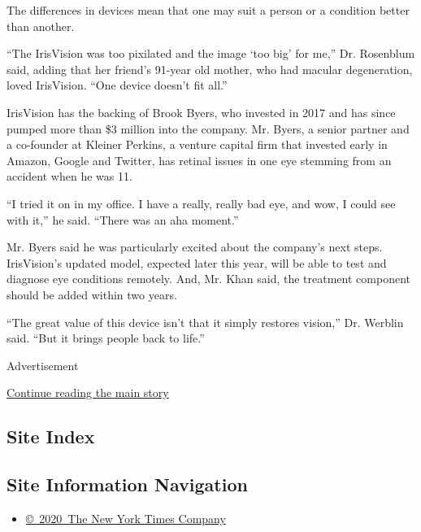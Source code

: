 The differences in devices mean that one may suit a person or a
condition better than another.

``The IrisVision was too pixilated and the image `too big' for me,'' Dr.
Rosenblum said, adding that her friend's 91-year old mother, who had
macular degeneration, loved IrisVision. ``One device doesn't fit all.''

IrisVision has the backing of Brook Byers, who invested in 2017 and has
since pumped more than \$3 million into the company. Mr. Byers, a senior
partner and a co-founder at Kleiner Perkins, a venture capital firm that
invested early in Amazon, Google and Twitter, has retinal issues in one
eye stemming from an accident when he was 11.

``I tried it on in my office. I have a really, really bad eye, and wow,
I could see with it,'' he said. ``There was an aha moment.''

Mr. Byers said he was particularly excited about the company's next
steps. IrisVision's updated model, expected later this year, will be
able to test and diagnose eye conditions remotely. And, Mr. Khan said,
the treatment component should be added within two years.

``The great value of this device isn't that it simply restores vision,''
Dr. Werblin said. ``But it brings people back to life.''

Advertisement

\protect\hyperlink{after-bottom}{Continue reading the main story}

\hypertarget{site-index}{%
\subsection{Site Index}\label{site-index}}

\hypertarget{site-information-navigation}{%
\subsection{Site Information
Navigation}\label{site-information-navigation}}

\begin{itemize}
\tightlist
\item
  \href{https://help.nytimes3xbfgragh.onion/hc/en-us/articles/115014792127-Copyright-notice}{©~2020~The
  New York Times Company}
\end{itemize}

